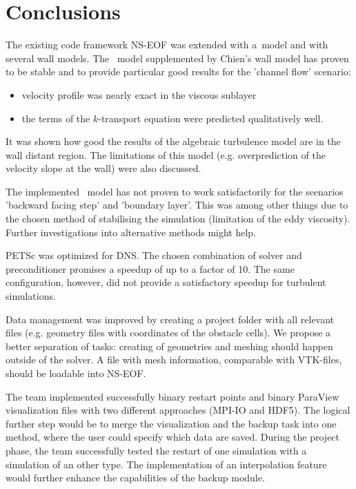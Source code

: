 \chapter{Conclusions} %
\label{cha:conclusion}

The existing code framework NS-EOF was extended with a \ke\,model and with several wall models. The \ke\, model supplemented by Chien's wall model has proven to be stable and to provide particular good results for the 'channel flow' scenario:
\begin{itemize}
\item velocity profile was nearly exact in the viscous sublayer
\item the terms of the $k$-transport equation were predicted qualitatively well. 
\end{itemize}
It was shown how good the results of the algebraic turbulence model are in the wall distant region. The limitations of this model (e.g. overprediction of  the velocity slope at the wall) were also discussed.

\noii The implemented \ke\, model has not proven to work satisfactorily for the scenarios 'backward facing step' and 'boundary layer'. This was among other things due to the chosen method of stabilising the simulation (limitation of the eddy viscosity). Further investigations into alternative methods might help. 

\noii PETSc was optimized for DNS. The chosen combination of solver and preconditioner promises a speedup of up to a factor of 10. The same configuration, however, did not provide a satisfactory speedup for turbulent simulations.

\noii Data management was improved by creating a project folder with all relevant files (e.g. geometry files with coordinates of the obstacle cells). We propose a better separation of tasks: creating of geometries and meshing should happen outside of the solver. A file with mesh information, comparable with VTK-files, should be loadable into NS-EOF.

\noii The team implemented successfully binary restart points and binary ParaView visualization files with two different approaches (MPI-IO and HDF5). The logical further step would be to merge the visualization and the backup task into one method, where the user could specify which data are saved. During the project phase, the team successfully tested the restart of one simulation with a simulation of an other type. The implementation of an interpolation feature would further enhance the capabilities of the backup module.


